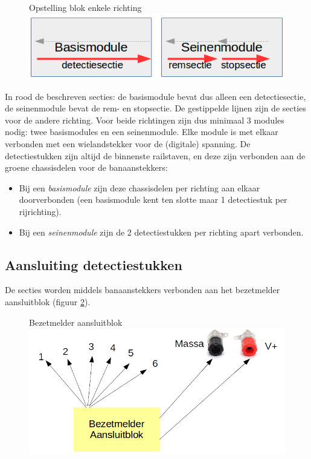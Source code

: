 \documentclass[12pt,a4paper]{report}
\begin{document}
\begin{figure}[!ht]
  \captionbox
  {Opstelling blok enkele richting\label{im:3secties}}
  {\includegraphics[scale=1.0]{images/rcu_3_secties}}
\end{figure}

In rood de beschreven secties: de basismodule bevat dus alleen een detectiesectie, de seinenmodule bevat de rem- en stopsectie. De gestippelde lijnen zijn de secties voor de andere richting.
Voor beide richtingen zijn dus minimaal 3 modules nodig: twee basismodules en een seinenmodule.
Elke module is met elkaar verbonden met een wielandstekker voor de (digitale) spanning. De detectiestukken zijn altijd de binnenste railstaven, en deze zijn verbonden aan de groene chassisdelen voor de banaanstekkers:
\begin{itemize}
\item Bij een \emph{basismodule} zijn deze chassisdelen per richting aan elkaar doorverbonden (een basismodule kent ten slotte maar 1 detectiestuk per rijrichting).
\item Bij een \emph{seinenmodule} zijn de 2 detectiestukken per richting apart verbonden.
\end{itemize}

\subsection{Aansluiting detectiestukken}
De secties worden middels banaanstekkers verbonden aan het bezetmelder aansluitblok (figuur \ref{im:rcu_bezetmelderblok}). 

\begin{figure}[!ht]
  \captionbox
  {Bezetmelder aansluitblok\label{im:rcu_bezetmelderblok}}
  {\includegraphics[scale=1.0]{images/rcu_bezetmelderblok}}
\end{figure}
\end{document}
